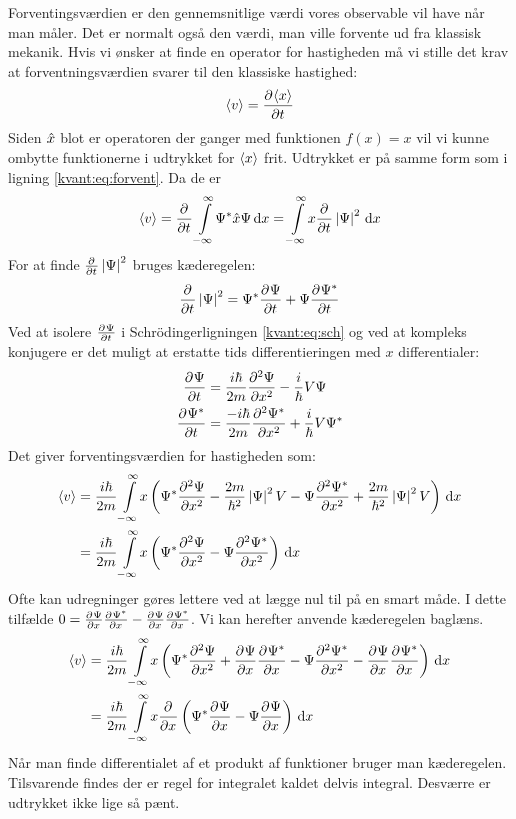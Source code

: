 \documentclass[../Kvantemekanik.tex]{subfiles}
\begin{document}
Forventingsværdien er den gennemsnitlige værdi vores observable vil have når man måler. Det er normalt også den værdi, man ville forvente ud fra klassisk mekanik. Hvis vi ønsker at finde en operator for hastigheden må vi stille det krav at forventningsværdien svarer til den klassiske hastighed:
$$
\expect v = \pdif{t}{\expect x}
$$
Siden $\op x$ blot er operatoren der ganger med funktionen $f(x)=x$ vil vi kunne ombytte funktionerne i udtrykket for $\expect x$ frit. Udtrykket er på samme form som i ligning \eqref{kvant:eq:forvent}. Da de er 
$$
\expect v = 
\pdif{t}{} \integral{\Psi^*\op x\Psi}{x}{-\infty}{\infty} = 
\integral{x\pdif{t}{}\abs{\Psi}^2}{x}{-\infty}{\infty}
$$
For at finde $\pdif{t}{}\abs{\Psi}^2$ bruges kæderegelen:
$$
\pdif{t}{}\abs{\Psi}^2 = \Psi^*\pdif{t}{\Psi}+\Psi\pdif{t}{\Psi^*}
$$
Ved at isolere $\pdif{t}{\Psi}$ i Schrödingerligningen \eqref{kvant:eq:sch} og ved at kompleks konjugere er det muligt at erstatte tids differentieringen med $x$ differentialer:
\begin{align*}
\pdif{t}{\Psi} &= \frac{i\hbar}{2m}\pdif[2]{x}{\Psi}-\frac{i}{\hbar}V\Psi\\
\pdif{t}{\Psi^*} &= \frac{-i\hbar}{2m}\pdif[2]{x}{\Psi^*}+\frac{i}{\hbar}V\Psi^*
\end{align*}
Det giver forventingsværdien for hastigheden som:
\begin{align*}
\expect v &= \frac{i\hbar}{2m}\integral{x
\left( 
\Psi^*\pdif[2]{x}{\Psi}-\frac{2m}{\hbar^2}\abs{\Psi}^2V
-\Psi\pdif[2]{x}{\Psi^*}+\frac{2m}{\hbar^2}\abs{\Psi}^2V
\right)}{x}{-\infty}{\infty} \\
&=
\frac{i\hbar}{2m}\integral{x\left(\Psi^*\pdif[2]{x}{\Psi}-\Psi\pdif[2]{x}{\Psi^*}\right)}{x}{-\infty}{\infty}
\end{align*}
Ofte kan udregninger gøres lettere ved at lægge nul til på en smart måde. I dette tilfælde $0=\pdif{x}{\Psi}\pdif{x}{\Psi^*}-\pdif{x}{\Psi}\pdif{x}{\Psi^*}$. Vi kan herefter anvende kæderegelen baglæns.
\begin{align*}
\expect v &= \frac{i\hbar}{2m}\integral{x\left(\Psi^*\pdif[2]{x}{\Psi}+\pdif{x}{\Psi}\pdif{x}{\Psi^*}-\Psi\pdif[2]{x}{\Psi^*}-\pdif{x}{\Psi}\pdif{x}{\Psi^*}\right)}{x}{-\infty}{\infty}\\
&= 
\frac{i\hbar}{2m}\integral{x\pdif{x}{}\left(\Psi^*\pdif{x}\Psi-\Psi\pdif{x}\Psi\right)}{x}{-\infty}{\infty}
\end{align*}
Når man finde differentialet af et produkt af funktioner bruger man kæderegelen. Tilsvarende findes der er regel for integralet kaldet delvis integral. Desværre er udtrykket ikke lige så pænt.
\end{document}

